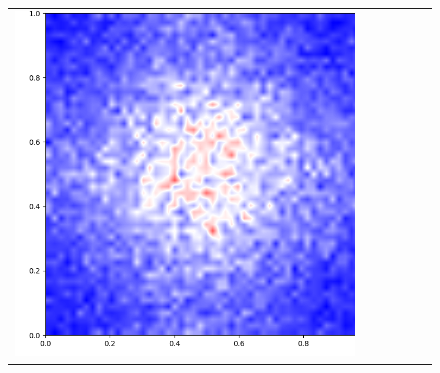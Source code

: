 \documentclass[12pt, reqno]{report}
\theoremstyle{definition}
\theoremstyle{remark}
\begin{document}
\begin{figure}[H]
\begin{tabular}{rccccc}
        \includegraphics[align = c, height=\subheight]{media_paper/cmap_MD_n=1000.png} \\


\end{tabular}
\end{figure}
\end{document}
